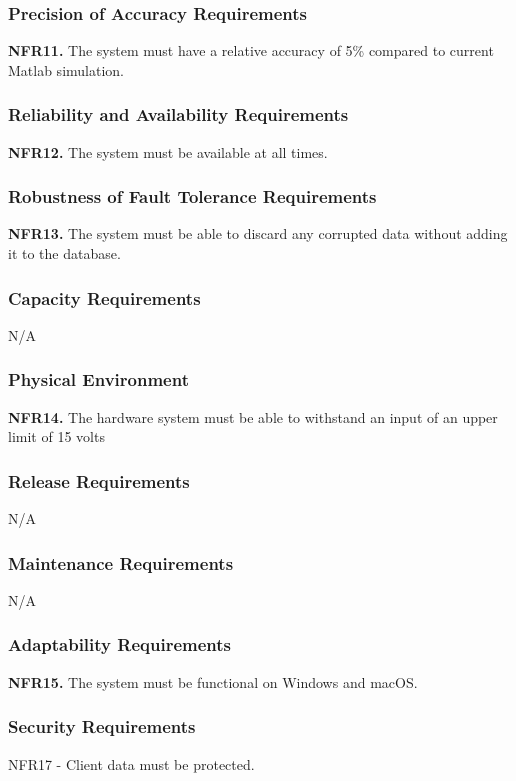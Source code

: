 \documentclass[12pt, titlepage]{article}
\begin{document}
\subsubsection{Precision of Accuracy Requirements}
\textbf{NFR11.} The system must have a relative accuracy of 5\% compared to current Matlab simulation.

\subsubsection{Reliability and Availability Requirements}
\textbf{NFR12.} The system must be available at all times.\\

\subsubsection{Robustness of Fault Tolerance Requirements}
\textbf{NFR13.} The system must be able to discard any corrupted data without adding it to the database.\\

\subsubsection{Capacity Requirements}
N/A
\subsubsection{Physical Environment}
\textbf{NFR14.} The hardware system must be able to withstand an input of an upper limit of 15 volts\\

\subsubsection{Release Requirements}
N/A
\subsubsection{Maintenance Requirements}
N/A

\subsubsection{Adaptability Requirements}
\textbf{NFR15.} The system must be functional on Windows and macOS.

\subsubsection{Security Requirements}
NFR17 - Client data must be protected.
\end{document}
